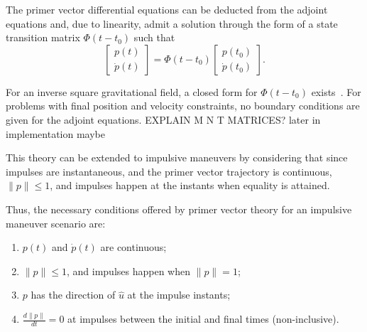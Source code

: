 The primer vector differential equations can be deducted from the adjoint equations and, due to linearity, admit a solution through the form of a state transition matrix \(\Phi(t - t_0)\) such that
\begin{equation}
    \begin{bmatrix}
        p(t) \\ \dot p(t)
    \end{bmatrix} = \Phi(t - t_0) \begin{bmatrix}
        p(t_0) \\ \dot p(t_0)
    \end{bmatrix}.
\end{equation}

For an inverse square gravitational field, a closed form for \(\Phi(t-t_0)\) exists~\cite{glandorf_transition_matrix}. For problems with final position and velocity constraints, no boundary conditions are given for the adjoint equations. EXPLAIN M N T MATRICES? later in implementation maybe


This theory can be extended to impulsive maneuvers by considering that since impulses are instantaneous, and the primer vector trajectory is continuous, \(\lVert p \rVert \leq 1\), and impulses happen at the instants when equality is attained.

Thus, the necessary conditions offered by primer vector theory for an impulsive maneuver scenario are:
\begin{enumerate}
    \item \(p(t)\) and \(\dot p(t)\) are continuous;
    \item \(\lVert p \rVert \leq 1\), and impulses happen when \(\lVert p \rVert = 1\);
    \item \(p\) has the direction of \(\hat u\) at the impulse instants;
    \item \(\frac{d \lVert p \rVert}{dt} = 0\) at impulses between the initial and final times (non-inclusive).
\end{enumerate}